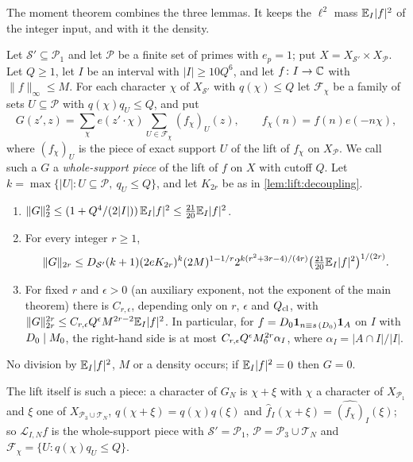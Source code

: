The moment theorem combines the three lemmas. It keeps the $\ell^2$ mass
$\mathbb E_I|f|^2$ of the integer input, and with it the density.

\begin{lemma}
\label{lem:record:lift-moments}
Let $\mathcal S'\subseteq\mathcal P_1$ and let $\mathcal P$ be a finite set of
primes with $e_p=1$; put $X=X_{\mathcal S'}\times X_{\mathcal P}$. Let $Q\ge1$, let
$I$ be an interval with $|I|\ge10Q^6$, and let $f\colon I\to\mathbb C$ with
$\|f\|_\infty\le M$. For each character $\chi$ of $X_{\mathcal S'}$ with
$q(\chi)\le Q$ let $\mathcal F_\chi$ be a family of sets $U\subseteq\mathcal P$
with $q(\chi)q_U\le Q$, and put
\[
 G(z',z)=\sum_\chi e(z'\cdot\chi)\sum_{U\in\mathcal F_\chi}(f_\chi)_U(z),
 \qquad f_\chi(n)=f(n)e(-n\chi),
\]
where $(f_\chi)_U$ is the piece of exact support $U$ of the lift of $f_\chi$ on
$X_{\mathcal P}$. We call such a $G$ a \emph{whole-support piece} of the lift of
$f$ on $X$ with cutoff $Q$. Let $k=\max\{|U|:U\subseteq\mathcal P,\ q_U\le Q\}$,
and let $K_{2r}$ be as in \cref{lem:lift:decoupling}.
\begin{enumerate}[label=(\alph*)]
\item $\|G\|_2^2\le(1+Q^4/(2|I|))\,\mathbb E_I|f|^2\le\tfrac{21}{20}\mathbb E_I|f|^2$.
\item For every integer $r\ge1$,
 \[
  \|G\|_{2r}\le D_{\mathcal S'}(k+1)(2eK_{2r})^k(2M)^{1-1/r}
  2^{k(r^2+3r-4)/(4r)}\big(\tfrac{21}{20}\mathbb E_I|f|^2\big)^{1/(2r)}.
 \]
\item For fixed $r$ and $\epsilon>0$ (an auxiliary exponent, not the exponent
 of the main theorem) there is $C_{r,\epsilon}$, depending only
 on $r$, $\epsilon$ and $Q_{\rm cl}$, with
 $\|G\|_{2r}^{2r}\le C_{r,\epsilon}Q^\epsilon M^{2r-2}\mathbb E_I|f|^2$. In particular,
 for $f=D_0\mathbf 1_{n\equiv s\,(D_0)}\mathbf 1_A$ on $I$ with $D_0\mid M_0$, the
 right-hand side is at most $C_{r,\epsilon}Q^\epsilon M_0^{2r}\alpha_I$, where
 $\alpha_I=|A\cap I|/|I|$.
\end{enumerate}
No division by $\mathbb E_I|f|^2$, $M$ or a density occurs; if $\mathbb E_I|f|^2=0$ then
$G=0$.
\end{lemma}

The lift itself is such a piece: a character of $G_N$ is $\chi+\xi$ with $\chi$
a character of $X_{\mathcal P_1}$ and $\xi$ one of $X_{\mathcal P_3\cup\mathcal T_N}$,
$q(\chi+\xi)=q(\chi)q(\xi)$ and $\widehat f_I(\chi+\xi)=\widehat{(f_\chi)}_I(\xi)$;
so $\mathcal L_{I,N}f$ is the whole-support piece with $\mathcal S'=\mathcal P_1$,
$\mathcal P=\mathcal P_3\cup\mathcal T_N$ and $\mathcal F_\chi=\{U:q(\chi)q_U\le Q\}$.

